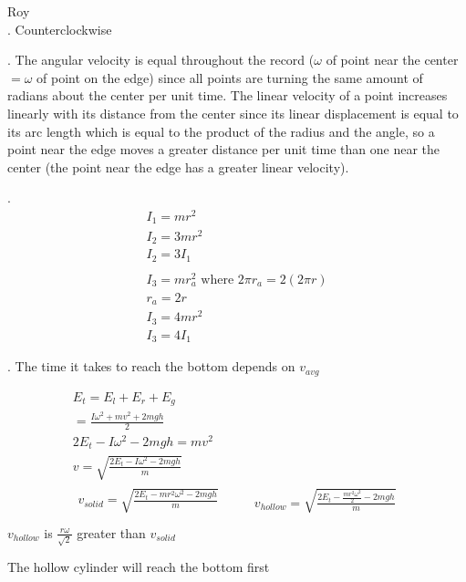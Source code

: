 \documentclass[12pt]{article}
\begin{document}
Roy
\\



. Counterclockwise 




. The angular velocity is equal throughout the record ($\omega$ of point near the center $= \omega$ of point on the edge) since all points are turning the same amount of radians about the center per unit time. The linear velocity of a point increases linearly with its distance from the center since its linear displacement is equal to its arc length which is equal to the product of the radius and the angle, so a point near the edge moves a greater distance per unit time than one near the center (the point near the edge has a greater linear velocity).




. 
\begin{gather*}
I_1 = mr^2 \\
I_2 = 3mr^2 \\
I_2 = 3I_1 \\
\\
I_3 = mr_a^2 \text{ where } 2\pi r_a = 2(2\pi r) \\
r_a = 2r \\
I_3 = 4mr^2 \\
I_3 = 4I_1
\end{gather*}




. The time it takes to reach the bottom depends on $v_{avg}$

\begin{gather*}
E_t = E_l + E_r + E_g \\
= \frac{I\omega^2 + mv^2 + 2mgh}{2} \\
2E_t - I\omega^2 - 2mgh = mv^2 \\
v = \sqrt{\frac{2E_t - I\omega^2 - 2mgh}{m}} \\
\begin{split}
v_{solid} = \sqrt{\frac{2E_t - mr^2\omega^2 - 2mgh}{m}} \\
\end{split}
\qquad
\begin{split}
v_{hollow} = \sqrt{\frac{2E_t - \frac{mr^2\omega^2}{2} - 2mgh}{m}} \\
\end{split}
\end{gather*}
$v_{hollow}$ is $\frac{r\omega}{\sqrt{2}}$ greater than $v_{solid}$

The hollow cylinder will reach the bottom first
\end{document}
